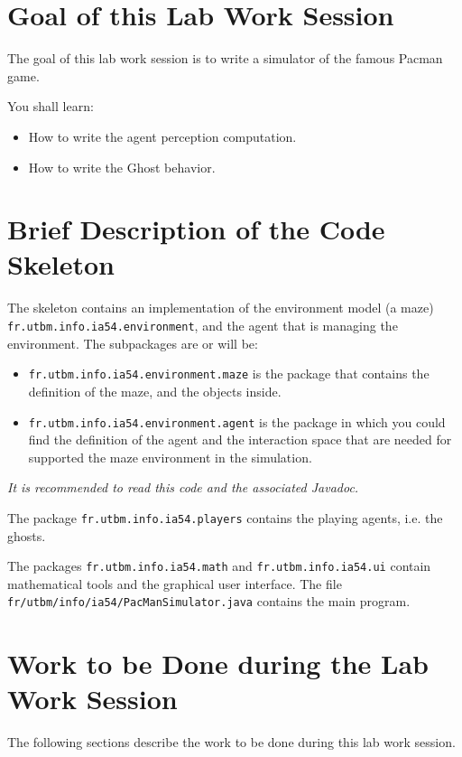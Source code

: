 \documentclass[article,english,nodocumentinfo]{utbmciadreport}
\begin{document}
\section{Goal of this Lab Work Session}

The goal of this lab work session is to write a simulator of the famous Pacman game.

You shall learn: 
\begin{itemize}
\item How to write the agent perception computation.
\item How to write the Ghost behavior.
\end{itemize}



\section{Brief Description of the Code Skeleton}

The skeleton contains an implementation of the environment model (a maze) \texttt{fr.utbm.info.ia54.environment}, and the agent that is managing the environment.
The subpackages are or will be:
\begin{itemize}
\item \texttt{fr.utbm.info.ia54.environment.maze} is the package that contains the definition of the maze, and the objects inside.
\item \texttt{fr.utbm.info.ia54.environment.agent} is the package in which you could find the definition of the agent and the interaction space that are needed for supported the maze environment in the simulation.
\end{itemize}

\emph{It is recommended to read this code and the associated Javadoc.}

The package \texttt{fr.utbm.info.ia54.players} contains the playing agents, i.e. the ghosts.

The packages \texttt{fr.utbm.info.ia54.math} and \texttt{fr.utbm.info.ia54.ui} contain mathematical tools and the graphical user interface.
The file \texttt{fr/utbm/info/ia54/PacManSimulator.java} contains the main program.

\section{Work to be Done during the Lab Work Session}

The following sections describe the work to be done during this lab work session.
\end{document}
